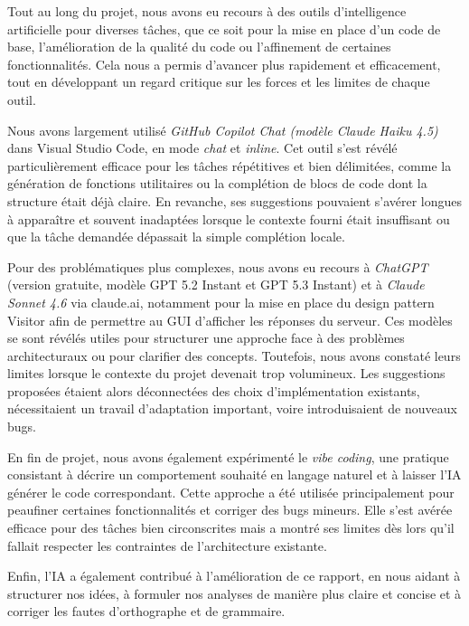 \documentclass[11pt]{article}
\begin{document}
Tout au long du projet, nous avons eu recours à des outils d'intelligence 
artificielle pour diverses tâches, que ce soit pour la mise en place d'un 
code de base, l'amélioration de la qualité du code ou l'affinement de 
certaines fonctionnalités. Cela nous a permis d'avancer plus rapidement 
et efficacement, tout en développant un regard critique sur les forces 
et les limites de chaque outil.

Nous avons largement utilisé \textit{GitHub Copilot Chat (modèle Claude Haiku 4.5)} dans Visual 
Studio Code, en mode \textit{chat} et \textit{inline}. Cet outil s'est 
révélé particulièrement efficace pour les tâches répétitives et bien 
délimitées, comme la génération de fonctions utilitaires ou la complétion 
de blocs de code dont la structure était déjà claire. En revanche, ses 
suggestions pouvaient s'avérer longues à apparaître et souvent inadaptées 
lorsque le contexte fourni était insuffisant ou que la tâche demandée 
dépassait la simple complétion locale.

Pour des problématiques plus complexes, nous avons eu recours à 
\textit{ChatGPT} (version gratuite, modèle GPT 5.2 Instant et GPT 5.3 Instant) et à 
\textit{Claude Sonnet 4.6} via claude.ai, notamment pour la mise en 
place du design pattern Visitor afin de permettre au GUI d’afficher les réponses du serveur. 
Ces modèles se sont révélés utiles pour structurer une 
approche face à des problèmes architecturaux ou pour clarifier des 
concepts. Toutefois, nous avons constaté leurs limites lorsque le 
contexte du projet devenait trop volumineux. Les suggestions proposées 
étaient alors déconnectées des choix d'implémentation existants, 
nécessitaient un travail d'adaptation important, voire introduisaient 
de nouveaux bugs.

En fin de projet, nous avons également expérimenté le \textit{vibe 
coding}, une pratique consistant à décrire un comportement souhaité en 
langage naturel et à laisser l'IA générer le code correspondant. Cette 
approche a été utilisée principalement pour peaufiner certaines 
fonctionnalités et corriger des bugs mineurs. Elle s'est avérée efficace 
pour des tâches bien circonscrites mais a montré ses limites dès lors 
qu'il fallait respecter les contraintes de l'architecture existante.

Enfin, l'IA a également contribué à l'amélioration de ce rapport, en 
nous aidant à structurer nos idées, à formuler nos analyses de manière 
plus claire et concise et à corriger les fautes d'orthographe et de 
grammaire.
\end{document}
